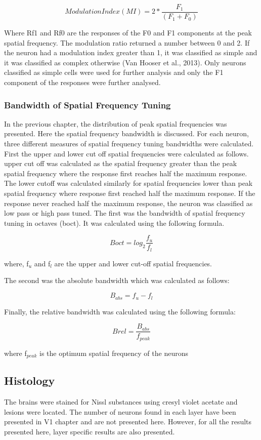 				\[Modulation Index (MI)= 2*\frac{F_1}{(F_1+F_0)}\]
				
				Where Rf1 and Rf0 are the responses of the F0 and F1 components at the peak spatial frequency.
				The modulation ratio returned a number between 0 and 2. If the neuron had a modulation index greater than 1, it was classified as simple and it was classified as complex otherwise (Van Hooser et al., 2013). Only neurons classified as simple cells were used for further analysis and only the F1 component of the responses were further analysed.
				
				\subsubsection{Bandwidth of Spatial Frequency Tuning}
				In the previous chapter, the distribution of peak spatial frequencies was presented. Here the spatial frequency bandwidth is discussed. For each neuron, three different measures of spatial frequency tuning bandwidths were calculated. First the upper and lower cut off spatial frequencies were calculated as follows. upper cut off was calculated as the spatial frequency greater than the peak spatial frequency where the response first reaches half the maximum response. The lower cutoff was calculated similarly for spatial frequencies lower than peak spatial frequency where response first reached half the maximum response. If the response never reached half the maximum response, the neuron was classified as low pass or high pass tuned. The first was the bandwidth of spatial frequency tuning in octaves (boct). It was calculated using the following formula.
				
				\[Boct=log_2\frac{f_u}{f_l}\]
				
				where, f$_u$ and f$_l$ are the upper and lower cut-off spatial frequencies.
				
				The second was the absolute bandwidth which was calculated as follows:
				
				\[B_{abs}=f_u-f_l\]
				
				Finally, the relative bandwidth was calculated using the following formula:
				
				\[Brel=\frac{B_{abs}}{f_{peak}}\]
				
				where f$_{peak}$ is the optimum spatial frequency of the neurons
								
		\subsection{Histology}
				The brains were stained for Nissl substances using cresyl violet acetate and lesions were located. The number of neurons found in each layer have been presented in V1 chapter and are not presented here. However, for all the results presented here, layer specific results are also presented.
							
